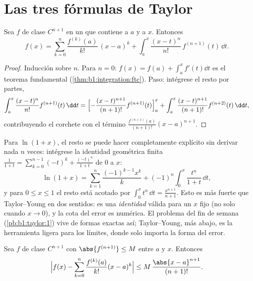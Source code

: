 \section{Las tres fórmulas de Taylor}

\begin{theorem}\label{thm:b1:taylor:integral}
Sea $f$ de clase $C^{n+1}$ en un  que contiene a $a$ y a $x$.
Entonces
\[
f(x) = \sum_{k=0}^{n} \frac{f^{(k)}(a)}{k!}\,(x - a)^k
+ \int_a^x \frac{(x - t)^n}{n!}\, f^{(n+1)}(t)\, \dd t .
\]
\end{theorem}

\begin{proof}
Inducción sobre $n$. Para $n = 0$:
$f(x) = f(a) + \int_a^x f'(t)\dd t$ es el teorema fundamental
(\cref{thm:b1:integration:ftc}). Paso: intégrese el resto por partes,
\[
\int_a^x \frac{(x-t)^n}{n!} f^{(n+1)}(t)\,\dd t
= \Bigl[-\frac{(x-t)^{n+1}}{(n+1)!} f^{(n+1)}(t)\Bigr]_a^x
+ \int_a^x \frac{(x-t)^{n+1}}{(n+1)!} f^{(n+2)}(t)\,\dd t ,
\]
contribuyendo el corchete con el término
$\frac{f^{(n+1)}(a)}{(n+1)!}(x - a)^{n+1}$.
\end{proof}

\begin{example}\label{ex:b1:taylor:lnexact}
Para $\ln(1 + x)$, el resto  se puede hacer completamente
explícito sin derivar nada $n$ veces: intégrese la identidad
geométrica finita
$\frac{1}{1+t} = \sum_{k=0}^{n-1}(-t)^k + \frac{(-t)^n}{1+t}$ de $0$
a $x$:
\[
\ln(1 + x) = \sum_{k=1}^{n} \frac{(-1)^{k-1}x^k}{k}
+ (-1)^n \int_0^x \frac{t^n}{1 + t}\,\dd t ,
\]
y para $0 \leq x \leq 1$ el resto está acotado por
$\int_0^x t^n\,\dd t = \frac{x^{n+1}}{n+1}$. Esto es más fuerte que
Taylor--Young en dos sentidos: es una \emph{identidad} válida para un
$x$ fijo (no solo cuando $x \to 0$), y la cota del error es numérica.
El problema del fin de semana (\cref{pb:b1:taylor:1}) vive de formas
exactas así; Taylor--Young, más abajo, es la herramienta ligera para
los límites, donde solo importa la forma del error.
\end{example}

\begin{theorem}\label{thm:b1:taylor:lagrange}
Sea $f$ de clase $C^{n+1}$ con $\abs{f^{(n+1)}} \leq M$ entre $a$ y
$x$. Entonces
\[
\Bigl| f(x) - \sum_{k=0}^{n} \frac{f^{(k)}(a)}{k!}(x-a)^k \Bigr|
\leq M\, \frac{\abs{x - a}^{n+1}}{(n+1)!} .
\]
\end{theorem}

